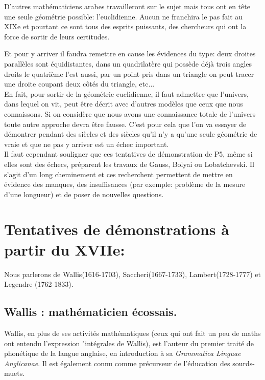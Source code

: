 \documentclass[a4paper, 12pt, twoside]{book}
\begin{document}
   D'autres mathématiciens arabes travailleront sur le sujet mais tous ont en tête une seule géométrie possible: l'euclidienne. Aucun ne franchira le pas fait au XIXe et pourtant ce sont tous des esprits puissants, des chercheurs qui ont la force de sortir de leurs certitudes.\bigskip 
   
    Et pour y arriver il faudra remettre en cause les évidences du type: deux droites parallèles sont équidistantes, dans un quadrilatère qui possède déjà trois angles droits le quatrième l'est aussi, par un point pris dans un triangle on peut tracer une droite coupant deux côtés du triangle, etc...\\
    
    En fait, pour sortir de la géométrie euclidienne, il faut admettre que  l'univers, dans lequel on vit, peut être décrit  avec d'autres modèles que ceux que nous connaissons. Si on considère que nous avons une connaissance totale de l'univers toute autre approche devra être fausse. C'est pour cela que l'on va essayer de démontrer pendant des siècles et des siècles qu'il n'y a qu'une seule géométrie de vraie et que ne pas y arriver est un échec important.\\
    
    Il faut cependant souligner que ces tentatives de démonstration de P5, même si elles sont des échecs, préparent les travaux de Gauss, Bolyai ou Lobatchevski. Il s'agit d'un long cheminement et ces recherchent permettent de mettre en évidence des manques, des insuffisances (par exemple: problème de la mesure d'une longueur) et de poser de nouvelles questions. 
    
    
 \section{Tentatives de démonstrations à partir du XVIIe:}
 
 Nous parlerons de Wallis(1616-1703), Saccheri(1667-1733), Lambert(1728-1777)  et Legendre (1762-1833).
     
     
     \subsection{Wallis : mathématicien écossais.}
     
     Wallis, en plus de ses activités mathématiques (ceux qui ont fait un peu de maths ont entendu l'expression "intégrales de Wallis),  est l'auteur du premier traité de phonétique de la langue anglaise, en introduction à sa \textit{Grammatica Linguae Anglicanae}. Il est également connu comme précurseur de l’éducation des sourds-muets.\\
     
\end{document}
